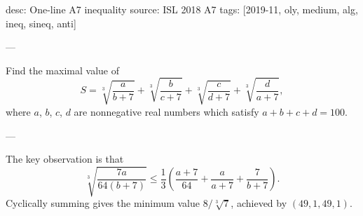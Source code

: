desc: One-line A7 inequality
source: ISL 2018 A7
tags: [2019-11, oly, medium, alg, ineq, sineq, anti]

---

Find the maximal value of \[S=\sqrt[3]{\frac a{b+7}}+\sqrt[3]{\frac b{c+7}}+\sqrt[3]{\frac c{d+7}}+\sqrt[3]{\frac d{a+7}},\]
where $a$, $b$, $c$, $d$ are nonnegative real numbers which satisfy $a+b+c+d=100$.

---

The key observation is that \[\sqrt[3]{\frac{7a}{64(b+7)}}\le\frac13\left(\frac{a+7}{64}+\frac a{a+7}+\frac7{b+7}\right).\]
Cyclically summing gives the minimum value $8/\sqrt[3]7$, achieved by $(49,1,49,1)$.
